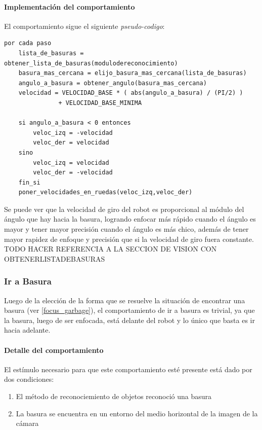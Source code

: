 \paragraph{Implementaci\'on del comportamiento}
\label{focus_garbage:impl}
El comportamiento sigue el siguiente \emph{pseudo-codigo}:
\begin{verbatim}
por cada paso
    lista_de_basuras = obtener_lista_de_basuras(modulodereconocimiento)
    basura_mas_cercana = elijo_basura_mas_cercana(lista_de_basuras)
    angulo_a_basura = obtener_angulo(basura_mas_cercana)
    velocidad = VELOCIDAD_BASE * ( abs(angulo_a_basura) / (PI/2) )
               + VELOCIDAD_BASE_MINIMA

    si angulo_a_basura < 0 entonces
        veloc_izq = -velocidad
        veloc_der = velocidad
    sino
        veloc_izq = velocidad
        veloc_der = -velocidad
    fin_si
    poner_velocidades_en_ruedas(veloc_izq,veloc_der)
\end{verbatim}

Se puede ver que la velocidad de giro del robot es proporcional al m\'odulo del \'angulo
que hay hacia la basura, logrando enfocar m\'as r\'apido cuando el \'angulo es mayor y
tener mayor precisi\'on cuando el \'angulo es m\'as chico, adem\'as de tener mayor rapidez
de enfoque y precisi\'on que si la velocidad de giro fuera constante.
\\
TODO HACER REFERENCIA A LA SECCION DE VISION CON OBTENERLISTADEBASURAS

\subsubsection{Ir a Basura}
\label{go_to_garbage}
Luego de la elecci\'on de la forma que se resuelve la situaci\'on de encontrar una
basura (ver \ref{focus_garbage}), el comportamiento de ir a basura es trivial, ya
que la basura, luego de ser enfocada, est\'a delante del robot y lo \'unico que
basta es ir hacia adelante.

\paragraph{Detalle del comportamiento}
El est\'imulo necesario para que este comportamiento est\'e presente est\'a
dado por dos condiciones:
\begin{enumerate}
\item El m\'etodo de reconociemiento de objetos reconoci\'o una basura
\item La basura se encuentra en un entorno del medio horizontal de la imagen de la c\'amara
\end{enumerate}


